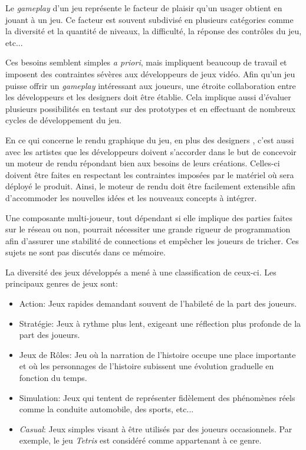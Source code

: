 \documentclass[12pt,twoside,letterpaper,francais]{book}
\begin{document}
Le \textit{gameplay} d'un jeu représente le facteur de plaisir qu'un
usager obtient en jouant à un jeu. Ce facteur est souvent subdivisé en
plusieurs catégories comme la diversité et la quantité de niveaux, la
difficulté, la réponse des contrôles du jeu, etc...

Ces besoins semblent simples \textit{a priori}, mais impliquent
beaucoup de travail et imposent des contraintes sévères aux
développeurs de jeux vidéo. Afin qu'un jeu puisse offrir un
\textit{gameplay} intéressant aux joueurs, une étroite collaboration
entre les développeurs et les designers doit être établie. Cela
implique aussi d'évaluer plusieurs possibilités en testant sur des
prototypes et en effectuant de nombreux cycles de développement du
jeu.

En ce qui concerne le rendu graphique du jeu, en plus des designers ,
c'est aussi avec les artistes que les développeurs doivent s'accorder
dans le but de concevoir un moteur de rendu répondant bien aux besoins
de leurs créations. Celles-ci doivent être faites en respectant les
contraintes imposées par le matériel où sera déployé le
produit. Ainsi, le moteur de rendu doit être facilement extensible
afin d'accommoder les nouvelles idées et les nouveaux concepts à
intégrer.

Une composante multi-joueur, tout dépendant si elle implique des
parties faites sur le réseau ou non, pourrait nécessiter une grande
rigueur de programmation afin d'assurer une stabilité de connections et
empêcher les joueurs de tricher. Ces sujets ne sont pas discutés dans
ce mémoire.

La diversité des jeux développés a mené à une classification de
ceux-ci. Les principaux genres de jeux sont:

\begin{itemize}
\item Action: Jeux rapides demandant souvent de l'habileté de la part
  des joueurs.
\item Stratégie: Jeux à rythme plus lent, exigeant une réflection plus
  profonde de la part des joueurs.
\item Jeux de Rôles: Jeu où la narration de l'histoire occupe une
  place importante et où les personnages de l'histoire subissent une
  évolution graduelle en fonction du temps.
\item Simulation: Jeux qui tentent de représenter fidèlement des
  phénomènes réels comme la conduite automobile, des sports, etc...
\item \textit{Casual}: Jeux simples visant à être utilisés par des
  joueurs occasionnels. Par exemple, le jeu \textit{Tetris} est
  considéré comme appartenant à ce genre.
\end{itemize}
\end{document}
